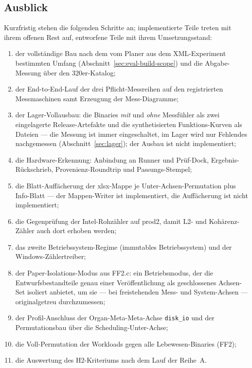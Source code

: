 \begin{nurlang}
\section{Ausblick}\label{sec:outlook}
Kurzfristig stehen die folgenden Schritte an; implementierte Teile treten mit ihrem offenen Rest auf,
entworfene Teile mit ihrem Umsetzungsstand:
\begin{enumerate}[label=(\arabic*)]
  \item der vollständige Bau nach dem vom Planer aus dem XML-Experiment bestimmten Umfang
  (Abschnitt~\ref{sec:eval-build-scope}) und die
  Abgabe-Messung über den 320er-Katalog;
  \item der End-to-End-Lauf der drei Pflicht-Messreihen auf den registrierten Messmaschinen samt Erzeugung der
  Mess-Diagramme;
  \item der Lager-Vollausbau: die Binaries \emph{mit} und \emph{ohne} Messfühler als zwei eingelagerte
  Release-Artefakte und die synthetisierten Funktions-Kurven als Dateien --- die Messung ist immer
  eingeschaltet, im Lager wird nur Fehlendes nachgemessen (Abschnitt~\ref{sec:lager}); der Ausbau ist
  nicht implementiert;
  \item die Hardware-Erkennung: Anbindung an Runner und Prüf-Dock, Ergebnis-Rückschrieb,
  Provenienz-Roundtrip und Passungs-Stempel;
  \item die Blatt-Auffächerung der xlsx-Mappe je Unter-Achsen-Permutation plus Info-Blatt --- der
  Mappen-Writer ist implementiert, die Auffächerung ist nicht implementiert;
  \item die Gegenprüfung der Intel-Rohzähler auf prod2, damit L2- und Kohärenz-Zähler auch dort erhoben
  werden;
  \item das zweite Betriebssystem-Regime (immutables Betriebssystem) und der Windows-Zählertreiber;
  \item der Paper-Isolations-Modus aus FF2.c: ein Betriebsmodus, der die Entwurfsbestandteile genau
  einer Veröffentlichung als geschlossenes Achsen-Set isoliert anbietet, um sie --- bei freistehenden
  Mess- und System-Achsen --- originalgetreu durchzumessen;
  \item der Profil-Anschluss der Organ-Meta-Meta-Achse \texttt{disk\_io} und der Permutationsbau über
  die Scheduling-Unter-Achse;
  \item die Voll-Permutation der Workloads gegen alle Lebewesen-Binaries (FF2);
  \item die Auswertung des H2-Kriteriums nach dem Lauf der Reihe~A\@.
\end{enumerate}


\end{nurlang}
